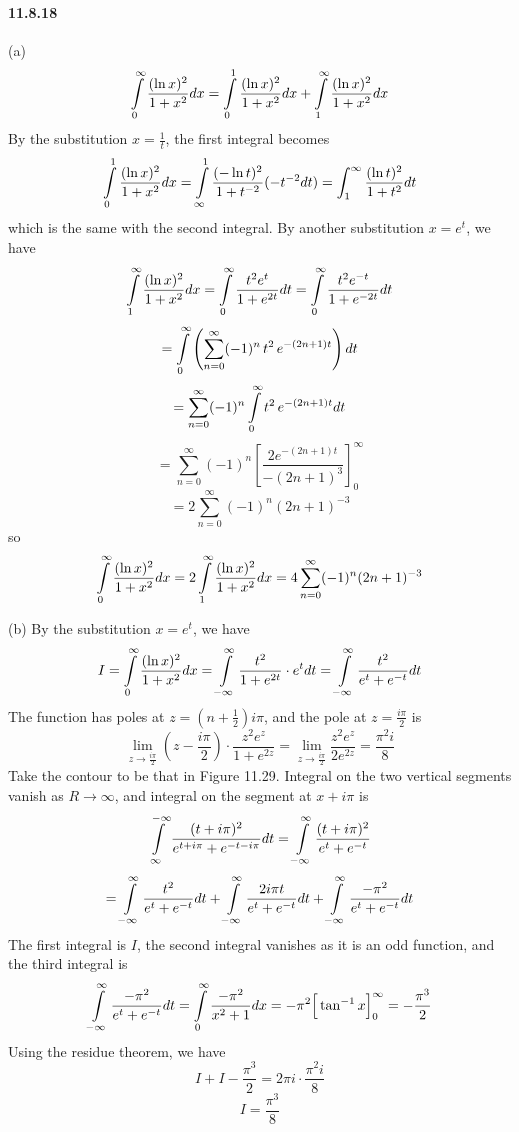 \documentclass[a4paper]{article}
\begin{document}
\paragraph{11.8.18}
(a)
\[
\int\displaylimits_0^\infty\frac{(\ln x)^2}{1+x^2}dx=\int\displaylimits_0^1\frac{(\ln x)^2}{1+x^2}dx+\int\displaylimits_1^\infty\frac{(\ln x)^2}{1+x^2}dx
\]
By the substitution $x=\frac{1}{t}$, the first integral becomes
\[
\int\displaylimits_0^1\frac{(\ln x)^2}{1+x^2}dx=\int\displaylimits_{\infty}^1\frac{(-\ln t)^2}{1+t^{-2}}(-t^{-2}dt)=\int_1^\infty\frac{(\ln t)^2}{1+t^2}dt
\]
which is the same with the second integral. By another substitution $x=e^t$, we have
\[
\int\displaylimits_1^\infty\frac{(\ln x)^2}{1+x^2}dx
=\int\displaylimits_0^\infty\frac{t^2e^t}{1+e^{2t}}dt=\int\displaylimits_0^\infty\frac{t^2e^{-t}}{1+e^{-2t}}dt
\]
\[
=\int\displaylimits_0^\infty\left(\sum_{n=0}^\infty(-1)^n\,t^2\, e^{-(2n+1)t} \right)dt
\]
\[
=\sum_{n=0}^\infty(-1)^n\int\displaylimits_0^\infty t^2\,e^{-(2n+1)t}dt
\]
\[
=\sum_{n=0}^\infty(-1)^n\left[\frac{2e^{-(2n+1)t}}{-(2n+1)^3} \right]_0^\infty
\]
\[
=2\sum_{n=0}^\infty(-1)^n(2n+1)^{-3}
\]
so
\[
\int\displaylimits_0^\infty\frac{(\ln x)^2}{1+x^2}dx=2\int\displaylimits_1^\infty\frac{(\ln x)^2}{1+x^2}dx=4\sum_{n=0}^\infty(-1)^n(2n+1)^{-3}
\]

(b)
By the substitution $x=e^t$, we have
\[
I=\int\displaylimits_0^\infty\frac{(\ln x)^2}{1+x^2}dx=\int\displaylimits_{-\infty}^\infty\frac{t^2}{1+e^{2t}}\cdot e^t dt=\int\displaylimits_{-\infty}^\infty\frac{t^2}{e^t+e^{-t}}dt
\]
The function has poles at $z=(n+\frac{1}{2})i\pi$, and the pole at $z=\frac{i\pi}{2}$ is
\[
\lim_{z\to\frac{i\pi}{2}}(z-\frac{i\pi}{2})\cdot\frac{z^2e^z}{1+e^{2z}}=\lim_{z\to\frac{i\pi}{2}}\frac{z^2e^z}{2e^{2z}}=\frac{\pi^2i}{8}
\]
Take the contour to be that in Figure 11.29. Integral on the two vertical segments vanish as $R\to\infty$, and integral on the segment at $x+i\pi$ is
\[
\int\displaylimits_{\infty}^{-\infty}\frac{(t+i\pi)^2}{e^{t+i\pi}+e^{-t-i\pi}}dt=\int\displaylimits_{-\infty}^\infty\frac{(t+i\pi)^2}{e^t+e^{-t}}\]
\[=\int\displaylimits_{-\infty}^\infty\frac{t^2}{e^t+e^{-t}}dt+\int\displaylimits_{-\infty}^\infty\frac{2i\pi t}{e^t+e^{-t}}dt+\int\displaylimits_{-\infty}^\infty\frac{-\pi^2}{e^t+e^{-t}}dt
\]
The first integral is $I$, the second integral vanishes as it is an odd function, and the third integral is
\[
\int\displaylimits_{-\infty}^\infty\frac{-\pi^2}{e^t+e^{-t}}dt=\int\displaylimits_0^\infty\frac{-\pi^2}{x^2+1}dx=-\pi^2\Big[\tan^{-1}x\Big]_0^\infty=-\frac{\pi^3}{2}
\]
Using the residue theorem, we have
\[
I+I-\frac{\pi^3}{2}=2\pi i\cdot\frac{\pi^2i}{8}
\]
\[
I=\frac{\pi^3}{8}
\]
\end{document}
